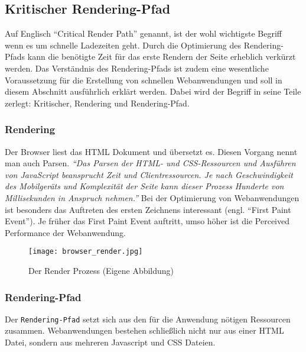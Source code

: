 	\pagebreak

	\subsection{Kritischer Rendering-Pfad} %
	\label{sub:critical_render_path}
		Auf Englisch "`Critical Render Path"' genannt, ist der wohl wichtigste Begriff wenn es um schnelle Ladezeiten geht. Durch die Optimierung des Rendering-Pfads kann die benötigte Zeit für das erste Rendern der Seite erheblich verkürzt werden. Das Verständnis des Rendering-Pfads ist zudem eine wesentliche Voraussetzung für die Erstellung von schnellen Webanwendungen und soll in diesem Abschnitt ausführlich erklärt werden. Dabei wird der Begriff in seine Teile zerlegt: Kritischer, Rendering und Rendering-Pfad.

		\subsubsection{Rendering} %
		\label{ssub:rendering}
			Der Browser liest das HTML Dokument und übersetzt es. Diesen Vorgang nennt man auch Parsen. \textit{"`Das Parsen der HTML- und CSS-Ressourcen und Ausführen von JavaScript beansprucht Zeit und Clientressourcen. Je nach Geschwindigkeit des Mobilgeräts und Komplexität der Seite kann dieser Prozess Hunderte von Millisekunden in Anspruch nehmen."'}\autocite{google14} Bei der Optimierung von Webanwendungen ist besonders das Auftreten des ersten Zeichnens interessant (engl. "`First Paint Event"'). Je früher das First Paint Event auftritt, umso höher ist die Perceived Performance der Webanwendung.

			\begin{figure}[htbp]
				\begin{center}
					\texttt{[image: browser\_render.jpg]}
					\caption{Der Render Prozess (Eigene Abbildung)}
					\label{fig:browser_render}
				\end{center}
			\end{figure}



		\subsubsection{Rendering-Pfad} %
		\label{ssub:rendering_pfad}

			Der \texttt{Rendering-Pfad} setzt sich aus den für die Anwendung nötigen Ressourcen zusammen. Webanwendungen bestehen schließlich nicht nur aus einer HTML Datei, sondern aus mehreren Javascript und CSS Dateien.

